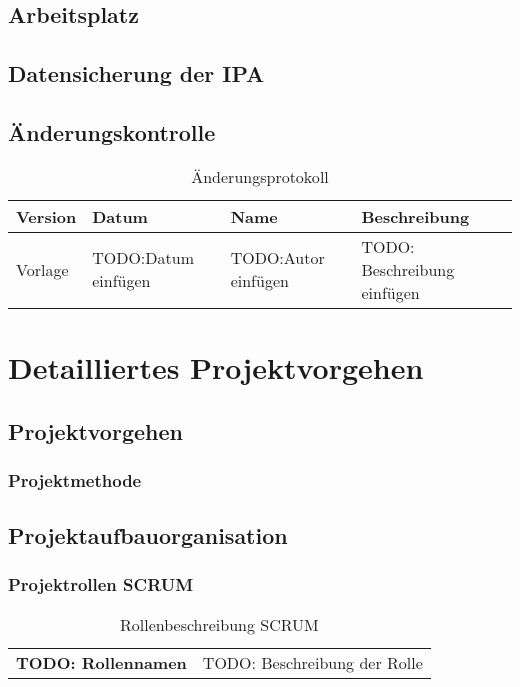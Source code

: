 \section{Arbeitsplatz}
  
\section{Datensicherung der IPA}

\section{Änderungskontrolle}

\begin{table}[H]
    \begin{tabular}{|L{0.15\textwidth}|L{0.15\textwidth}|L{0.18\textwidth}|L{0.41\textwidth}|}
        \hline
        \color{white}Version &\color{white} Datum & \color{white}Name & \color{white}Beschreibung \\
        \hline
        Vorlage & TODO:Datum einfügen & TODO:Autor einfügen & TODO: Beschreibung einfügen \\
        \hline
    \end{tabular}
    \caption{Änderungsprotokoll}
\end{table}

\chapter{Detailliertes Projektvorgehen}

\section{Projektvorgehen}

\subsection{Projektmethode}

\section{Projektaufbauorganisation}
\subsection{Projektrollen SCRUM}

\begin{table}[H]
    \begin{tabular}{|L{0.3\textwidth}|L{0.65\textwidth}|}
        \hline
          \\[12pt]
        \hline
        \textbf{TODO: Rollennamen} & TODO: Beschreibung der Rolle \\
        \hline
    \end{tabular}
    \caption{Rollenbeschreibung SCRUM}
\end{table}

